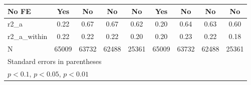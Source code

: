 {\begin{tabular}{l*{8}{c}}
\addlinespace
No FE               &         Yes         &          No         &          No         &          No         &         Yes         &          No         &          No         &          No         \\
\midrule
r2\_a                &        0.22         &        0.67         &        0.67         &        0.62         &        0.20         &        0.64         &        0.63         &        0.60         \\
r2\_a\_within         &        0.22         &        0.22         &        0.22         &        0.20         &        0.20         &        0.23         &        0.22         &        0.18         \\
N                   &       65009         &       63732         &       62488         &       25361         &       65009         &       63732         &       62488         &       25361         \\
\bottomrule
\multicolumn{9}{l}{\footnotesize Standard errors in parentheses}\\
\multicolumn{9}{l}{\footnotesize \sym{*} \(p<0.1\), \sym{**} \(p<0.05\), \sym{***} \(p<0.01\)}\\
\end{tabular}
}

